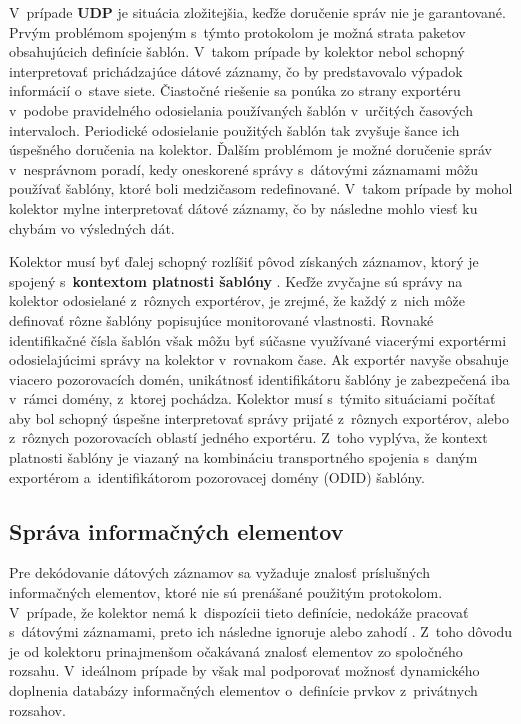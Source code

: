 V~prípade \textbf{UDP} je situácia zložitejšia, keďže doručenie správ nie je garantované. Prvým problémom spojeným s~týmto protokolom je možná strata paketov obsahujúcich definície šablón. V~takom prípade by kolektor nebol schopný interpretovať prichádzajúce dátové záznamy,
čo by predstavovalo výpadok informácií o~stave siete. Čiastočné riešenie sa ponúka zo strany exportéru v~podobe pravidelného odosielania používaných šablón v~určitých časových intervaloch. Periodické odosielanie použitých šablón tak zvyšuje šance ich úspešného doručenia na kolektor.
Ďalším problémom je možné doručenie správ v~nesprávnom poradí, kedy oneskorené správy s~dátovými záznamami môžu používať šablóny, ktoré boli medzičasom redefinované. V~takom prípade by mohol kolektor mylne interpretovať dátové záznamy, čo by následne mohlo viesť ku chybám vo výsledných dát.

Kolektor musí byť ďalej schopný rozlíšiť pôvod získaných záznamov, ktorý je spojený s~\textbf{kontextom platnosti šablóny} \cite{hutak}. Keďže zvyčajne sú správy na kolektor odosielané z~rôznych exportérov, je zrejmé, že každý z~nich môže definovať rôzne šablóny popisujúce monitorované
vlastnosti. Rovnaké identifikačné čísla šablón však môžu byť súčasne využívané viacerými exportérmi odosielajúcimi správy na kolektor v~rovnakom čase. Ak exportér navyše obsahuje viacero pozorovacích domén, unikátnosť identifikátoru šablóny je zabezpečená iba v~rámci domény, z~ktorej pochádza.
Kolektor musí s~týmito situáciami počítať aby bol schopný úspešne interpretovať správy prijaté z~rôznych exportérov, alebo z~rôznych pozorovacích oblastí jedného exportéru.
Z~toho vyplýva, že kontext platnosti šablóny je viazaný na kombináciu transportného spojenia s~daným exportérom a~identifikátorom pozorovacej domény (ODID) šablóny.

\subsection*{Správa informačných elementov}

Pre dekódovanie dátových záznamov sa vyžaduje znalosť príslušných informačných elementov, ktoré nie sú prenášané použitým protokolom. V~prípade, že kolektor nemá k~dispozícii tieto definície, nedokáže pracovať s~dátovými záznamami, preto ich následne ignoruje alebo zahodí \cite{rfc5153}.
Z~toho dôvodu je od kolektoru prinajmenšom očakávaná znalosť elementov zo spoločného rozsahu. V~ideálnom prípade by však mal podporovať možnosť dynamického doplnenia databázy informačných elementov o~definície prvkov z~privátnych rozsahov.

